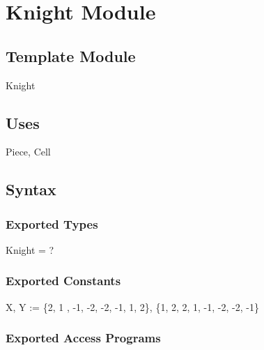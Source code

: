 \documentclass[12pt]{article}
\begin{document}
\newpage

































\section* {Knight Module}

\subsection*{Template Module}

Knight

\subsection* {Uses}

Piece, Cell

\subsection* {Syntax}

\subsubsection* {Exported Types}

Knight = ?

\subsubsection* {Exported Constants}

X, Y := \{2, 1 , -1, -2, -2, -1, 1, 2\}, \{1, 2, 2, 1, -1, -2, -2, -1\}

\subsubsection* {Exported Access Programs}
\end{document}

